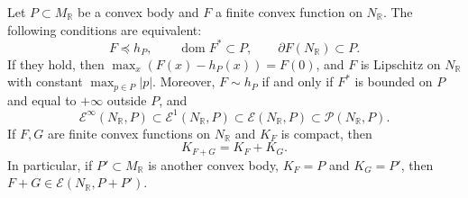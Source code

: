 \begin{proposition}\label{prop:convex-support-growth-characterization}
Let $P\subset M_{\mathbb R}$ be a convex body and $F$ a finite convex function on $N_{\mathbb R}$. The following conditions are equivalent:
\[
 F\preceq h_P,\qquad\operatorname{dom}F^*\subset P,
                       \qquad\partial F(N_{\mathbb R})\subset P.
\]
If they hold, then $\max_x(F(x)-h_P(x))=F(0)$, and $F$ is Lipschitz on $N_{\mathbb R}$ with constant $\max_{p\in P}|p|$. Moreover, $F\sim h_P$ if and only if $F^*$ is bounded on $P$ and equal to $+\infty$ outside $P$, and
\[
 \mathcal E^\infty(N_{\mathbb R},P)\subset\mathcal E^1(N_{\mathbb R},P)\subset\mathcal E(N_{\mathbb R},P)\subset\mathcal P(N_{\mathbb R},P).
\]
If $F,G$ are finite convex functions on $N_{\mathbb R}$ and $K_F$ is compact, then
\[
 K_{F+G}=K_F+K_G.
\]
In particular, if $P'\subset M_{\mathbb R}$ is another convex body, $K_F=P$ and $K_G=P'$, then $F+G\in\mathcal E(N_{\mathbb R},P+P')$.
\end{proposition}
